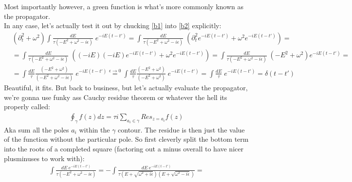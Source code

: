 \documentclass{article}
\begin{document}
Most importantly however, a green function is what's more commonly known as the propagator. \\
In any case, let's actually test it out by chucking \ref{b1} into \ref{b2} explicitly:
\begin{align}
	&(\partial_{t}^2 + \omega^2) \int \frac{dE}{\tau(-E^2+\omega^2-i\epsilon)} \; e^{-iE(t-t')} = \int \frac{dE}{\tau(-E^2+\omega^2-i\epsilon)} \; \left(\partial_{t}^2e^{-iE(t-t')} + \omega^2e^{-iE(t-t')}\right) = \\[1.5ex]
	&= \int \frac{dE}{\tau(-E^2+\omega^2-i\epsilon)} \; \left((-iE)(-iE)e^{-iE(t-t')} + \omega^2e^{-iE(t-t')}\right) = \int \frac{dE}{\tau(-E^2+\omega^2-i\epsilon)} \; \left(-E^2 + \omega^2\right)e^{-iE(t-t')} = \\[1.5ex]
	&=  \int \frac{dE}{\tau} \frac{\left(-E^2 + \omega^2\right)}{(-E^2+\omega^2-i\epsilon)} \; e^{-iE(t-t')}\stackrel{\epsilon \rightarrow 0}{=} \int \frac{dE}{\tau} \frac{\left(-E^2 + \omega^2\right)}{(-E^2+\omega^2)} \; e^{-iE(t-t')} = \int \frac{dE}{\tau} \; e^{-iE(t-t')} = \delta(t-t')
\end{align}
Beautiful, it fits. But back to business, but let's actually evaluate the propagator, we're gonna use funky ass Cauchy residue theorem or whatever the hell its properly called:
\begin{align}
\oint_{\gamma} f(z)dz = \tau i \sum_{a_i \in \gamma} Res_{z=a_i} f(z)
\end{align}
Aka sum all the poles $a_i$ within the $\gamma$ contour. The residue is then just the value of the function without the particular pole. So first cleverly split the bottom term into the roots of a completed square (factoring out a minus overall to have nicer plusminuses to work with):
\begin{align}
	\int \frac{dE\; e^{-iE(t-t')}}{\tau(-E^2+\omega^2-i\epsilon)}  = -\int \frac{dE \; e^{-iE(t-t')}}{\tau\left( E + \sqrt{\omega^2 + i\epsilon}\right)\left( E + \sqrt{\omega^2 - i\epsilon}\right)}=
\end{align}
\end{document}
